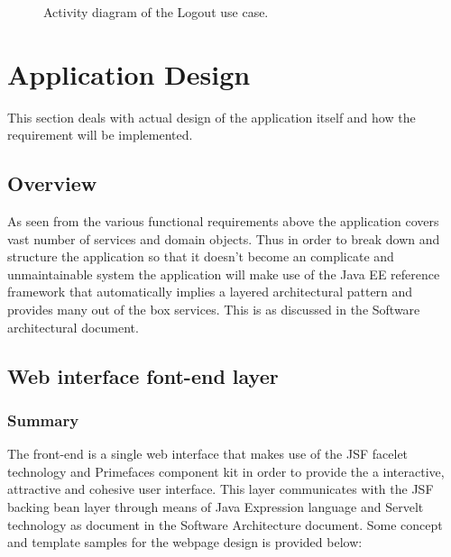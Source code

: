 \documentclass[12pt]{article}
\begin{document}
\begin{figure}[H]
\centering	
{}
\caption{Activity diagram of the Logout use case.}
\end{figure}

\vspace{0.2in}
\newpage
\section{Application Design}
This section deals with actual design of the application itself and how the requirement will be implemented.
\subsection{Overview}
As seen from the various functional requirements above the application covers vast number of services and domain objects. Thus in order to break down and structure the application so that it doesn't become an complicate and unmaintainable system the application will make use of the Java EE reference framework that automatically implies a layered architectural pattern and provides many out of the box services. This is as discussed in the Software architectural document.

\newpage
\subsection{Web interface font-end layer}
\subsubsection{Summary}
The front-end is a single web interface that makes use of the JSF facelet technology and Primefaces component kit in order to provide the a interactive, attractive and cohesive user interface. This layer communicates with the JSF backing bean layer through means of Java Expression language and Servelt technology as document in the Software Architecture document. Some concept and template samples for the webpage design is provided below:
\newpage
\end{document}
